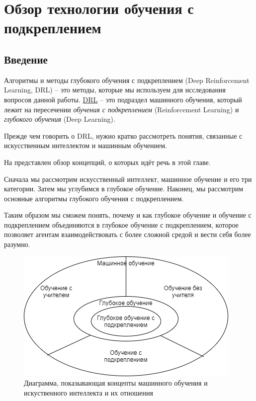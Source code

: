 \chapter{Обзор технологии обучения с подкреплением} \label{ch1}

\section{Введение} \label{ch1:intro}

Алгоритмы и методы глубокого обучения с подкреплением (Deep Reinforcement Learning, DRL) – это методы, которые мы используем для исследования вопросов данной работы. \hyperref[acr:drl]{DRL} – это подраздел машинного обучения, который лежит на пересечении \textit{обучения с подкреплением} (Reinforcement Learning) и \textit{глубокого обучения} (Deep Learning).

Прежде чем говорить о DRL, нужно кратко рассмотреть понятия, связанные с искусственным интеллектом и машинным обучением.

На  представлен обзор концепций, о которых идёт речь в этой главе. 

Сначала мы рассмотрим искусственный интеллект, машинное обучение и его три категории. Затем мы углубимся в глубокое обучение. Наконец, мы рассмотрим основные алгоритмы глубокого обучения с подкреплением.

Таким образом мы сможем понять, почему и как глубокое обучение и обучение с подкреплением объединяются в глубокое обучение с подкреплением, которое позволяет агентам взаимодействовать с более сложной средой и вести себя более разумно.

\begin{figure}[ht!] 
	\center
	\includegraphics [scale=0.80] {my_folder/images/ch1/ML-and-AI-concepts.png}
	\caption{Диаграмма, показывающая концепты машинного обучения и искуственного интеллекта и их отношения} 
	\label{fig:ch1-ML-and-AI-concepts}  
\end{figure}

